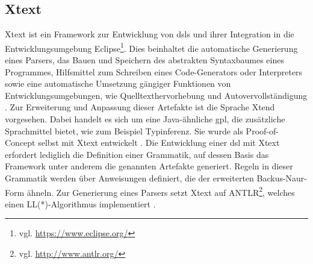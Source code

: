 \subsection{Xtext}
    \label{section:solutionDetailsDslXtext}
    Xtext ist ein Framework zur Entwicklung von \glspl{dsl} und ihrer Integration
    in die Entwicklungsumgebung Eclipse\footnote{vgl. \url{https://www.eclipse.org/}}.
    Dies beinhaltet die automatische Generierung eines Parsers,
    das Bauen und Speichern des abstrakten Syntaxbaumes eines Programmes,
    Hilfsmittel zum Schreiben eines Code-Generators oder Interpreters
    sowie eine automatische Umsetzung gängiger Funktionen von
    Entwicklungsumgebungen, wie Quelltexthervorhebung und Autovervollständigung
    \cite[Kapitel 1]{bettini:xtext}.
    Zur Erweiterung und Anpassung dieser Artefakte ist die Sprache Xtend vorgesehen.
    Dabei handelt es sich um eine Java-ähnliche \gls{gpl},
    die zusätzliche Sprachmittel bietet, wie zum Beispiel Typinferenz.
    Sie wurde als Proof-of-Concept selbst mit Xtext entwickelt
    \cite[Kapitel 3]{bettini:xtext}.
    Die Entwicklung einer \gls{dsl} mit Xtext erfordert lediglich die Definition
    einer Grammatik, auf dessen Basis das Framework unter anderem die genannten 
    Artefakte generiert.
    Regeln in dieser Grammatik werden über Anweisungen definiert,
    die der erweiterten Backus-Naur-Form ähneln.
    Zur Generierung eines Parsers setzt Xtext auf
    ANTLR\footnote{vgl. \url{http://www.antlr.org/}},
    welches einen LL(*)-Algorithmus implementiert
    \cite{xtext:documentation,parr:antlr}.
